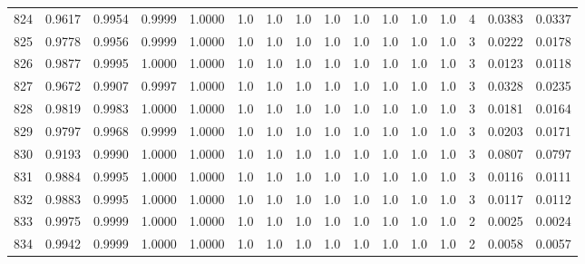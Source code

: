 \begin{tabular}{lrrrrrrrrrrrrrrr}
824 &      0.9617 &  0.9954 &  0.9999 &  1.0000 &     1.0 &     1.0 &     1.0 &     1.0 &     1.0 &     1.0 &      1.0 &        1.0 &      4 &                    0.0383 &                     0.0337 \\
825 &      0.9778 &  0.9956 &  0.9999 &  1.0000 &     1.0 &     1.0 &     1.0 &     1.0 &     1.0 &     1.0 &      1.0 &        1.0 &      3 &                    0.0222 &                     0.0178 \\
826 &      0.9877 &  0.9995 &  1.0000 &  1.0000 &     1.0 &     1.0 &     1.0 &     1.0 &     1.0 &     1.0 &      1.0 &        1.0 &      3 &                    0.0123 &                     0.0118 \\
827 &      0.9672 &  0.9907 &  0.9997 &  1.0000 &     1.0 &     1.0 &     1.0 &     1.0 &     1.0 &     1.0 &      1.0 &        1.0 &      3 &                    0.0328 &                     0.0235 \\
828 &      0.9819 &  0.9983 &  1.0000 &  1.0000 &     1.0 &     1.0 &     1.0 &     1.0 &     1.0 &     1.0 &      1.0 &        1.0 &      3 &                    0.0181 &                     0.0164 \\
829 &      0.9797 &  0.9968 &  0.9999 &  1.0000 &     1.0 &     1.0 &     1.0 &     1.0 &     1.0 &     1.0 &      1.0 &        1.0 &      3 &                    0.0203 &                     0.0171 \\
830 &      0.9193 &  0.9990 &  1.0000 &  1.0000 &     1.0 &     1.0 &     1.0 &     1.0 &     1.0 &     1.0 &      1.0 &        1.0 &      3 &                    0.0807 &                     0.0797 \\
831 &      0.9884 &  0.9995 &  1.0000 &  1.0000 &     1.0 &     1.0 &     1.0 &     1.0 &     1.0 &     1.0 &      1.0 &        1.0 &      3 &                    0.0116 &                     0.0111 \\
832 &      0.9883 &  0.9995 &  1.0000 &  1.0000 &     1.0 &     1.0 &     1.0 &     1.0 &     1.0 &     1.0 &      1.0 &        1.0 &      3 &                    0.0117 &                     0.0112 \\
833 &      0.9975 &  0.9999 &  1.0000 &  1.0000 &     1.0 &     1.0 &     1.0 &     1.0 &     1.0 &     1.0 &      1.0 &        1.0 &      2 &                    0.0025 &                     0.0024 \\
834 &      0.9942 &  0.9999 &  1.0000 &  1.0000 &     1.0 &     1.0 &     1.0 &     1.0 &     1.0 &     1.0 &      1.0 &        1.0 &      2 &                    0.0058 &                     0.0057 \\

\end{tabular}
